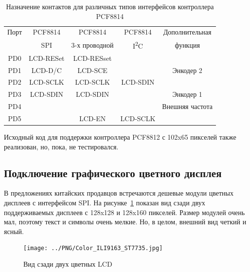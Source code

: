 \begin{table}[H]
  \begin{center}
    \begin{tabular}{| c || c | c | c | c |}
    \hline
     Порт  &  PCF8814    & PCF8814        & PCF8814     & Дополнительная \\
           &    SPI      & 3-х проводной  & I\textsuperscript{2}C  & функция \\
    \hline
    \hline
    PD0    &   LCD-RESet  & LCD-RESset       &            & \\
    \hline
    PD1    &   LCD-D/C   & LCD-SCE        &             & Энкодер 2 \\
    \hline
    PD2    &   LCD-SCLK  & LCD-SCLK       &  LCD-SDIN   & \\
    \hline
    PD3    &   LCD-SDIN  & LCD-SDIN       &             & Энкодер 1 \\
    \hline
    PD4    &             &                &             & Внешняя частота \\
    \hline
    PD5    &             & LCD-EN         &   LCD-SCLK  & \\
    \hline
    \end{tabular}
  \end{center}
  \caption{Назначение контактов для различных типов интерфейсов контроллера PCF8814}
  \label{tab:PCF8814-con}
\end{table}

Исходный код для поддержки контроллера PCF8812 с 102x65 пикселей также реализован, 
но, пока, не тестировался.

\subsection{Подключение графического цветного дисплея}

В предложениях китайских продавцов встречаются дешевые модули цветных дисплеев с интерфейсом SPI.
На рисунке~\ref{fig:Color_both} показан вид сзади двух поддерживаемых дисплеев с 128x128 и 
128x160 пикселей.
Размер модулей очень мал, поэтому текст и символы очень мелкие.
Но, в целом, внешний вид четкий и ясный.

\begin{figure}[H]
\centering
\texttt{[image: ../PNG/Color\_ILI9163\_ST7735.jpg]}
\caption{Вид сзади двух цветных LCD}
\label{fig:Color_both}
\end{figure}

